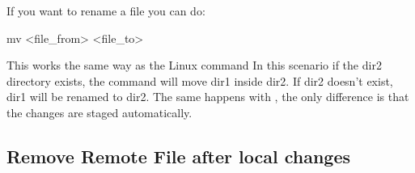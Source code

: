 \noindent If you want to rename a file you can do:
\begin{gitBashBox}
mv <file_from> <file_to>
\end{gitBashBox}

This works the same way as the Linux command   
In this scenario if the dir2 directory exists, the command will move dir1 inside dir2. If dir2 doesn’t exist, dir1 will be renamed to dir2.\newline
The same happens with , the only difference is that the changes are staged automatically.

\subsection{Remove Remote File after local changes}